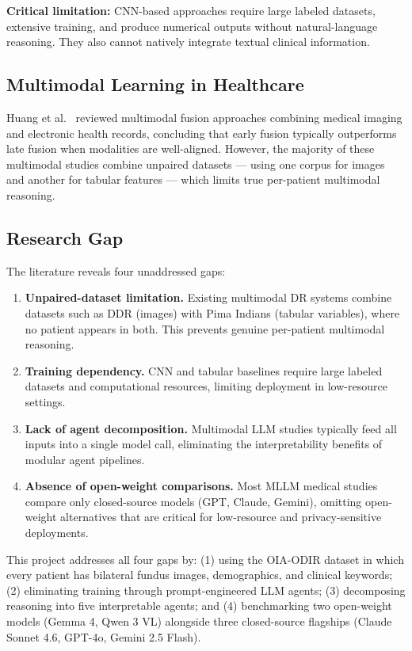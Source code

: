 \documentclass[11pt,a4paper]{article}
\begin{document}
\textbf{Critical limitation:} CNN-based approaches require large labeled datasets, extensive training, and produce numerical outputs without natural-language reasoning. They also cannot natively integrate textual clinical information.

\subsection{Multimodal Learning in Healthcare}

Huang et al.~\cite{huang2020npj} reviewed multimodal fusion approaches combining medical imaging and electronic health records, concluding that early fusion typically outperforms late fusion when modalities are well-aligned. However, the majority of these multimodal studies combine unpaired datasets --- using one corpus for images and another for tabular features --- which limits true per-patient multimodal reasoning.

\subsection{Research Gap}

The literature reveals four unaddressed gaps:

\begin{enumerate}
    \item \textbf{Unpaired-dataset limitation.} Existing multimodal DR systems combine datasets such as DDR (images) with Pima Indians (tabular variables), where no patient appears in both. This prevents genuine per-patient multimodal reasoning.
    \item \textbf{Training dependency.} CNN and tabular baselines require large labeled datasets and computational resources, limiting deployment in low-resource settings.
    \item \textbf{Lack of agent decomposition.} Multimodal LLM studies typically feed all inputs into a single model call, eliminating the interpretability benefits of modular agent pipelines.
    \item \textbf{Absence of open-weight comparisons.} Most MLLM medical studies compare only closed-source models (GPT, Claude, Gemini), omitting open-weight alternatives that are critical for low-resource and privacy-sensitive deployments.
\end{enumerate}

This project addresses all four gaps by: (1) using the OIA-ODIR dataset in which every patient has bilateral fundus images, demographics, and clinical keywords; (2) eliminating training through prompt-engineered LLM agents; (3) decomposing reasoning into five interpretable agents; and (4) benchmarking two open-weight models (Gemma 4, Qwen 3 VL) alongside three closed-source flagships (Claude Sonnet 4.6, GPT-4o, Gemini 2.5 Flash).
\end{document}
